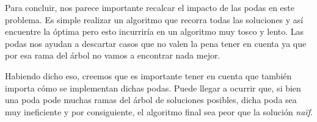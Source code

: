 Para concluir, nos parece importante recalcar el impacto de las podas en este problema. Es simple realizar un algoritmo que recorra todas las soluciones y así encuentre la óptima pero esto incurriría en un algoritmo muy tosco y lento. Las podas nos ayudan a descartar casos que no valen la pena tener en cuenta ya que por esa rama del árbol no vamos a encontrar nada mejor.

Habiendo dicho eso, creemos que es importante tener en cuenta que también importa cómo se implementan dichas podas. Puede llegar a ocurrir que, si bien una poda pode muchas ramas del árbol de soluciones posibles, dicha poda sea muy ineficiente y por consiguiente, el algoritmo final sea peor que la solución \emph{naïf}.